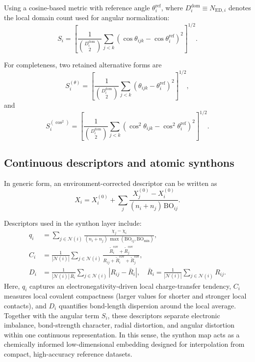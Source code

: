 \documentclass[journal=jctcce,manuscript=article]{achemso}
\begin{document}
Using a cosine-based metric with reference angle $\theta_i^{\mathrm{ref}}$, where $D_i^{\mathrm{dom}} \equiv N_{\mathrm{ED},i}$ denotes the local domain count used for angular normalization:
\begin{equation}
S_i=
\left[
\frac{1}{\binom{D_i^{\mathrm{dom}}}{2}}
\sum_{j<k}
\left(\cos\theta_{ijk}-\cos\theta_i^{\mathrm{ref}}\right)^2
\right]^{1/2}.
\end{equation}

For completeness, two retained alternative forms are
\begin{equation}
S_i^{(\theta)}=
\left[
\frac{1}{\binom{D_i^{\mathrm{dom}}}{2}}
\sum_{j<k}\left(\theta_{ijk}-\theta_i^{\mathrm{ref}}\right)^2
\right]^{1/2},
\end{equation}
and
\begin{equation}
S_i^{(\cos^2)}=
\left[
\frac{1}{\binom{D_i^{\mathrm{dom}}}{2}}
\sum_{j<k}\left(\cos^2\theta_{ijk}-\cos^2\theta_i^{\mathrm{ref}}\right)^2
\right]^{1/2}.
\end{equation}

\subsection{Continuous descriptors and atomic synthons}
In generic form, an environment-corrected descriptor can be written as
\begin{equation}
X_i=
X_i^{(0)}+\sum_j\frac{X_j^{(0)}-X_i^{(0)}}{(n_i+n_j)\,\mathrm{BO}_{ij}}.
\end{equation}

Descriptors used in the synthon layer include:
\begin{align}
q_i &= \sum_{j\in\mathcal{N}(i)}\frac{\chi_j-\chi_i}{(n_i+n_j)\,\max(\mathrm{BO}_{ij},\mathrm{BO}_{\min})},\\
C_i &= \frac{1}{|\mathcal{N}(i)|}\sum_{j\in\mathcal{N}(i)}
\frac{\tilde R^{\mathrm{cov}}_i+\tilde R^{\mathrm{cov}}_j}{R_{ij}+\tilde R^{\mathrm{cov}}_i+\tilde R^{\mathrm{cov}}_j},\\
D_i &= \frac{1}{|\mathcal{N}(i)|\,\bar R_i}\sum_{j\in\mathcal{N}(i)}|R_{ij}-\bar R_i|,
\quad
\bar R_i=\frac{1}{|\mathcal{N}(i)|}\sum_{j\in\mathcal{N}(i)}R_{ij}.
\end{align}
Here, $q_i$ captures an electronegativity-driven local charge-transfer tendency, $C_i$ measures local covalent compactness (larger values for shorter and stronger local contacts), and $D_i$ quantifies bond-length dispersion around the local average. Together with the angular term $S_i$, these descriptors separate electronic imbalance, bond-strength character, radial distortion, and angular distortion within one continuous representation. In this sense, the synthon map acts as a chemically informed low-dimensional embedding designed for interpolation from compact, high-accuracy reference datasets.
\end{document}
